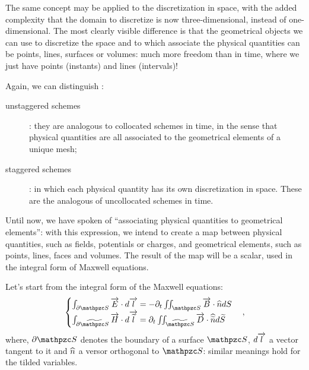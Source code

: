 The same concept may be applied to the discretization in space, with
the added complexity that the domain to discretize is now three-dimensional,
instead of one-dimensional. The most clearly visible difference is
that the geometrical objects we can use to discretize the space and to
which associate the physical quantities can be points, lines, surfaces
or volumes: much more freedom than in time, where we just have points
(instants) and lines (intervals)!

Again, we can distinguish \cite{bolla_piers}:
\begin{description}
\item[unstaggered schemes]: they are analogous to collocated
  schemes in time, in the sense that physical quantities are all
  associated to the geometrical elements of a unique mesh;
\item[staggered schemes]: in which each physical quantity has its
  own discretization in space. These are the analogous of
  uncollocated schemes in time.
\end{description}

Until now, we have spoken of ``associating physical quantities to
geometrical elements'': with this expression, we intend to create a
map between physical quantities, such as fields, potentials or
charges, and geometrical elements, such as points, lines, faces and
volumes. The result of the map will be a scalar, used in the integral
form of Maxwell equations.

Let's start from the integral form of the Maxwell equations:
\begin{equation} \label{eqn:maxwell_integral} \begin{cases}
    \int_{\partial \Surface{S}}{\DotProd{\E}{\d \Vector{l}}} =
    -\partial_t \iint_{\Surface{S}}{\DotProd{\B}{\Versor{n}} \d S} \\
    \int_{\partial \DualSurface{S}}{\DotProd{\H}{\d \Vector{\Dual{l}}}} =
    \partial_t \iint_{\DualSurface{S}}{\DotProd{\D}{\Versor{\Dual{n}}} \d \Dual{S}} \\
\end{cases}, \end{equation}
where, $\partial \Surface{S}$ denotes the boundary of a surface
$\Surface{S}$, $d \overrightarrow{l}$ a vector tangent to it and $\widehat{n}$
a versor orthogonal to $\Surface{S}$: similar meanings hold for the tilded
variables.

